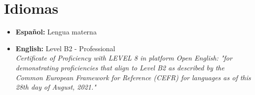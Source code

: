 \documentclass[a4paper,10pt]{article}
\begin{document}
	
	\section*{Idiomas}
	\begin{itemize}
		\item \textbf{Español:} Lengua materna
		\item \textbf{English:} Level B2 - Professional\\
		\textit{Certificate of Proficiency with LEVEL 8 in platform Open English: "for demonstrating proficiencies that align to Level B2 as described by the Common European Framework for Reference (CEFR) for languages as of this 28th day of August, 2021."}
		
	\end{itemize}
	
	
\end{document}
